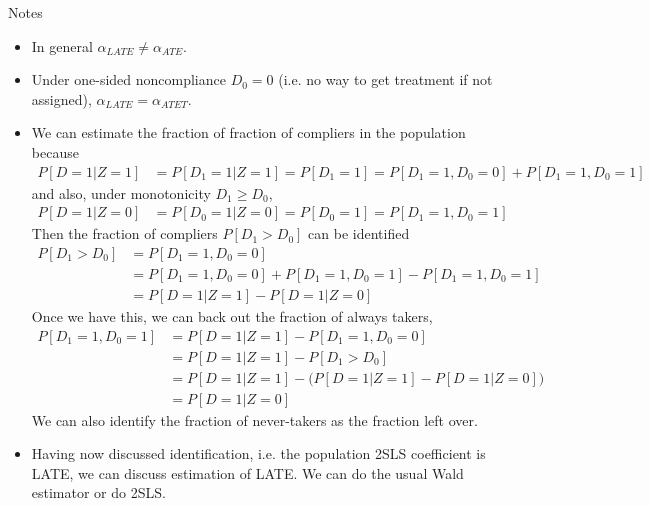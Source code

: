 \documentclass[12pt]{article}
\theoremstyle{plain}
\theoremstyle{definition}
\theoremstyle{remark}
\begin{document}
Notes
\begin{itemize}
  \item
    In general $\alpha_{LATE}\neq \alpha_{ATE}$.

  \item
    Under one-sided noncompliance $D_0=0$ (i.e. no way to get treatment
    if not assigned), $\alpha_{LATE}=\alpha_{ATET}$.

  \item
    We can estimate the fraction of fraction of compliers in the
    population because
    \begin{align*}
      P[D=1|Z=1]
      &=
      P[D_1=1|Z=1]
      =
      P[D_1=1]
      =
      P[D_1=1,D_0=0]
      +
      P[D_1=1,D_0=1]
    \end{align*}
    and also, under monotonicity $D_1\geq D_0$,
    \begin{align*}
      P[D=1|Z=0]
      &=
      P[D_0=1|Z=0]
      =
      P[D_0=1]
      =
      P[D_1=1,D_0=1]
    \end{align*}
    Then the fraction of compliers $P[D_1>D_0]$ can be identified
    \begin{align*}
      P[D_1>D_0]
      &=
      P[D_1=1,D_0=0]
      \\
      &=
      P[D_1=1,D_0=0]
      +
      P[D_1=1,D_0=1]
      -
      P[D_1=1,D_0=1]
      \\
      &=
      P[D=1|Z=1]
      -
      P[D=1|Z=0]
    \end{align*}
    Once we have this, we can back out the fraction of always takers,
    \begin{align*}
      P[D_1=1,D_0=1]
      &=
      P[D=1|Z=1]
      -
      P[D_1=1,D_0=0]
      \\
      &=
      P[D=1|Z=1]
      -
      P[D_1>D_0]
      \\
      &=
      P[D=1|Z=1]
      -
      \big(
      P[D=1|Z=1]
      -
      P[D=1|Z=0]
      \big)
      \\
      &=
      P[D=1|Z=0]
    \end{align*}
    We can also identify the fraction of never-takers as the fraction
    left over.

  \item
    Having now discussed identification, i.e. the population 2SLS
    coefficient is LATE, we can discuss estimation of LATE.
    We can do the usual Wald estimator or do 2SLS.
\end{itemize}



\clearpage
\end{document}
